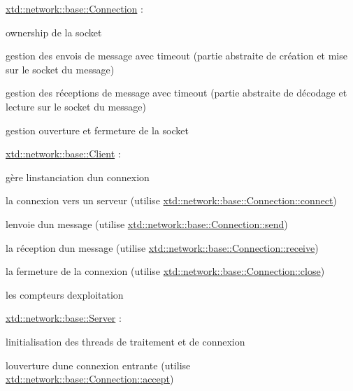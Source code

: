 \begin{DoxyItemize}
\item \hyperlink{classxtd_1_1network_1_1base_1_1Connection}{xtd\+::network\+::base\+::\+Connection} \+:
\begin{DoxyItemize}
\item ownership de la socket
\item gestion des envois de message avec timeout (partie abstraite de création et mise sur le socket du message)
\item gestion des réceptions de message avec timeout (partie abstraite de décodage et lecture sur le socket du message)
\item gestion ouverture et fermeture de la socket
\end{DoxyItemize}
\item \hyperlink{classxtd_1_1network_1_1base_1_1Client}{xtd\+::network\+::base\+::\+Client} \+:
\begin{DoxyItemize}
\item gère l\textquotesingle{}instanciation d\textquotesingle{}un connexion
\item la connexion vers un serveur (utilise \hyperlink{classxtd_1_1network_1_1base_1_1Connection_a408b83f0e43d18e32f31d6c13d6dcdf3}{xtd\+::network\+::base\+::\+Connection\+::connect})
\item l\textquotesingle{}envoie d\textquotesingle{}un message (utilise \hyperlink{classxtd_1_1network_1_1base_1_1Connection_a8ebc5958cf7d27a902bd75a55c4648bf}{xtd\+::network\+::base\+::\+Connection\+::send})
\item la réception d\textquotesingle{}un message (utilise \hyperlink{classxtd_1_1network_1_1base_1_1Connection_a09146c9c2dbf1ad85867fd0afab15c0c}{xtd\+::network\+::base\+::\+Connection\+::receive})
\item la fermeture de la connexion (utilise \hyperlink{classxtd_1_1network_1_1base_1_1Connection_a73097d339a3716c05fee7ee19753ee4a}{xtd\+::network\+::base\+::\+Connection\+::close})
\item les compteurs d\textquotesingle{}exploitation
\end{DoxyItemize}
\item \hyperlink{classxtd_1_1network_1_1base_1_1Server}{xtd\+::network\+::base\+::\+Server} \+:
\begin{DoxyItemize}
\item l\textquotesingle{}initialisation des threads de traitement et de connexion
\item l\textquotesingle{}ouverture d\textquotesingle{}une connexion entrante (utilise \hyperlink{classxtd_1_1network_1_1base_1_1Connection_af8da803db4caa1f125548508cf3db134}{xtd\+::network\+::base\+::\+Connection\+::accept})

\end{DoxyItemize}
\end{DoxyItemize}
